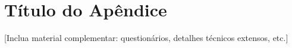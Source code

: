\appendix

\section{Título do Apêndice}

[Inclua material complementar: questionários, detalhes técnicos extensos, etc.]

